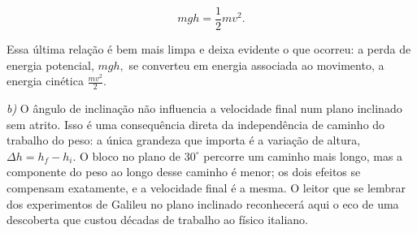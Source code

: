 \begin{exemplo}[Nível II]
$$ mgh = \dfrac{1}{2}mv^2.$$

Essa última relação é bem mais limpa e deixa evidente o que ocorreu: a perda de energia potencial, $mgh,$ se converteu em energia associada ao movimento, a energia cinética $\frac{mv^2}{2}.$



\medskip




\textit{b)} O ângulo de inclinação não influencia a velocidade final num
plano inclinado sem atrito. Isso é uma consequência direta da
independência de caminho do trabalho do peso: a única grandeza que
importa é a variação de altura, $\Delta h = h_f - h_i$. O bloco no
plano de $30^\circ$ percorre um caminho mais longo, mas a componente do peso
ao longo desse caminho é menor; os dois efeitos se compensam
exatamente, e a velocidade final é a mesma. O leitor que se lembrar
dos experimentos de Galileu no plano inclinado reconhecerá aqui o eco
de uma descoberta que custou décadas de trabalho ao físico italiano.

\end{exemplo}


\vspace{0.3cm}





